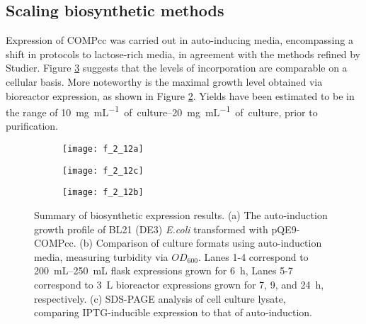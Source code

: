 \begin{refsection}
\subsection{Scaling biosynthetic methods}

Expression of COMPcc was carried out in auto-inducing media, encompassing a
shift in protocols to lactose-rich media, in agreement with the methods refined
by Studier.\cite{Studier2005} Figure \ref{fig:AI_IPTG_gel} suggests that the
levels of incorporation are comparable on a cellular basis. More noteworthy is
the maximal growth level obtained via bioreactor expression, as shown in Figure
\ref{fig:bioreactor_OD_comparison}. Yields have been estimated to be in the
range of \SIrange{10}{20}{\mg\per\mL of culture}, prior to purification.
\begin{figure}[h!]
    \centering
    \begin{subfigure}[b]{0.3\textwidth}
        \texttt{[image: f\_2\_12a]}
        \caption{}
        \label{fig:AI_OD_curve}
    \end{subfigure}
    \begin{subfigure}[b]{0.3\textwidth}
        \texttt{[image: f\_2\_12c]}
        \caption{}
        \label{fig:bioreactor_OD_comparison}
    \end{subfigure}
    \begin{subfigure}[b]{0.3\textwidth}
        \texttt{[image: f\_2\_12b]}
        \caption{}
        \label{fig:AI_IPTG_gel} \end{subfigure}
    \caption[Summary of biosynthetic expresssion results]{Summary of
        biosynthetic expression results. (a) The auto-induction growth profile
        of BL21 (DE3) \emph{E.coli} transformed with pQE9-COMPcc. (b) Comparison
        of culture formats using auto-induction media, measuring turbidity via
        ${OD_{600}}$. Lanes 1-4 correspond to \SIrange{200}{250}{\mL} flask
        expressions grown for \SI{6}{\hour}, Lanes 5-7 correspond to \SI{3}{\L}
        bioreactor expressions grown for 7, 9, and \SI{24}{\hour}, respectively.
    (c) SDS-PAGE analysis of cell culture lysate, comparing IPTG-inducible
expression to that of auto-induction.}
\label{fig:expression_results}
\end{figure}



\end{refsection}
